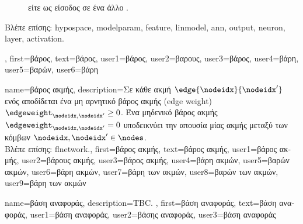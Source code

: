 {{\begin{figure}[H]
{{			 \foreignlanguage{greek}{είτε ως είσοδος σε ένα άλλο} . \label{fig_weights_dict}} }
		\end{figure}
		\foreignlanguage{greek}{Βλέπε επίσης:} \gls{hypospace}, \gls{modelparam}, \gls{feature}, \gls{linmodel}, \gls{ann}, \gls{output}, \gls{neuron}, 
		\gls{layer}, \gls{activation}.},
	first={\foreignlanguage{greek}{βάρος}},
	text={\foreignlanguage{greek}{βάρος}},
	user1={\foreignlanguage{greek}{βάρος}}, %
	user2={\foreignlanguage{greek}{βαρους}}, %
	user3={\foreignlanguage{greek}{βάρος}}, %
	user4={\foreignlanguage{greek}{βάρη}}, %
	user5={\foreignlanguage{greek}{βαρών}}, %
	user6={\foreignlanguage{greek}{βάρη}} %
}

{name={\foreignlanguage{greek}{βάρος ακμής}},
	description={\foreignlanguage{greek}{Σε κάθε ακμή $\edge{\nodeidx}{\nodeidx'}$ ενός} 
		 \foreignlanguage{greek}{αποδίδεται ένα μη αρνητικό βάρος ακμής} (edge weight)  
		$\edgeweight_{\nodeidx,\nodeidx'}\geq0$. \foreignlanguage{greek}{Ένα μηδενικό βάρος ακμής $\edgeweight_{\nodeidx,\nodeidx'}=0$ 
		υποδεικνύει την απουσία μίας ακμής μεταξύ των κόμβων} $\nodeidx, \nodeidx' \in \nodes$.
		\\
		\foreignlanguage{greek}{Βλέπε επίσης:} \gls{flnetwork}.}, 
	first={\foreignlanguage{greek}{βάρος ακμής}},
	text={\foreignlanguage{greek}{βάρος ακμής}},
	user1={\foreignlanguage{greek}{βάρος ακμής}}, %
	user2={\foreignlanguage{greek}{βάρους ακμής}}, %
	user3={\foreignlanguage{greek}{βάρος ακμής}}, %
	user4={\foreignlanguage{greek}{βάρη ακμών}}, %
	user5={\foreignlanguage{greek}{βαρών ακμών}}, %
	user6={\foreignlanguage{greek}{βάρη ακμών}}, %
	user7={\foreignlanguage{greek}{βάρη των ακμών}}, %
	user8={\foreignlanguage{greek}{βαρών των ακμών}}, %
	user9={\foreignlanguage{greek}{βάρη των ακμών}} %
}

{name={\foreignlanguage{greek}{βάση αναφοράς}},
	description={TBC. },
    first={\foreignlanguage{greek}{βάση αναφοράς}},
    text={\foreignlanguage{greek}{βάση αναφοράς}},
    user1={\foreignlanguage{greek}{βάση αναφοράς}}, %
    user2={\foreignlanguage{greek}{βάσης αναφοράς}}, %
    user3={\foreignlanguage{greek}{βάση αναφοράς}} %
}

